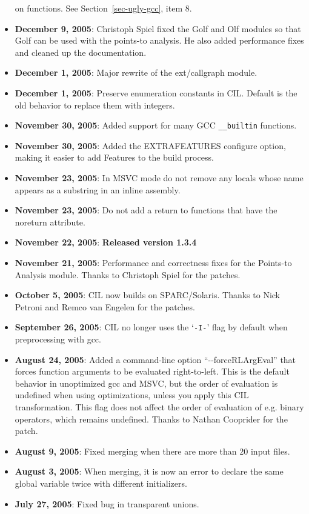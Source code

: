 \documentclass{article}
\def\secref#1{Section~\ref{sec-#1}}
\def\t#1{{\tt #1}}
\begin{document}
\begin{itemize}
  on functions.  See \secref{ugly-gcc}, item 8.  
\item {\bf December 9, 2005}: Christoph Spiel fixed the Golf and
  Olf modules so that Golf can be used with the points-to analysis.
  He also added performance fixes and cleaned up the documentation.
\item {\bf December 1, 2005}: Major rewrite of the ext/callgraph module. 
\item {\bf December 1, 2005}: Preserve enumeration constants in CIL. Default
is the old behavior to replace them with integers.
\item {\bf November 30, 2005}: Added support for many GCC \t{\_\_builtin}
  functions. 
\item {\bf November 30, 2005}: Added the EXTRAFEATURES configure
  option, making it easier to add Features to the build process.
\item {\bf November 23, 2005}: In MSVC mode do not remove any locals whose name
  appears as a substring in an inline assembly. 
\item {\bf November 23, 2005}: Do not add a return to functions that have the
  noreturn attribute. 
\item {\bf November 22, 2005}: {\bf Released version 1.3.4}
\item {\bf November 21, 2005}: Performance and correctness fixes for
  the Points-to Analysis module.  Thanks to Christoph Spiel for the
  patches.
\item {\bf October 5, 2005}: CIL now builds on SPARC/Solaris.  Thanks
  to Nick Petroni and Remco van Engelen for the patches.
\item {\bf September 26, 2005}: CIL no longer uses the `\t{-I-}' flag
  by default when preprocessing with gcc.
\item {\bf August 24, 2005}: Added a command-line option
  ``-{}-forceRLArgEval'' that forces function arguments to be evaluated
  right-to-left.  This is the default behavior in unoptimized gcc and
  MSVC, but the order of evaluation is undefined when using
  optimizations, unless you apply this CIL transformation.  This flag
  does not affect the order of evaluation of e.g. binary operators,
  which remains undefined.  Thanks to Nathan Cooprider for the patch.
\item {\bf August 9, 2005}: Fixed merging when there are more than 20
  input files.
\item {\bf August 3, 2005}: When merging, it is now an error to
  declare the same global variable twice with different initializers.
\item {\bf July 27, 2005}: Fixed bug in transparent unions.

\end{itemize}
\end{document}
